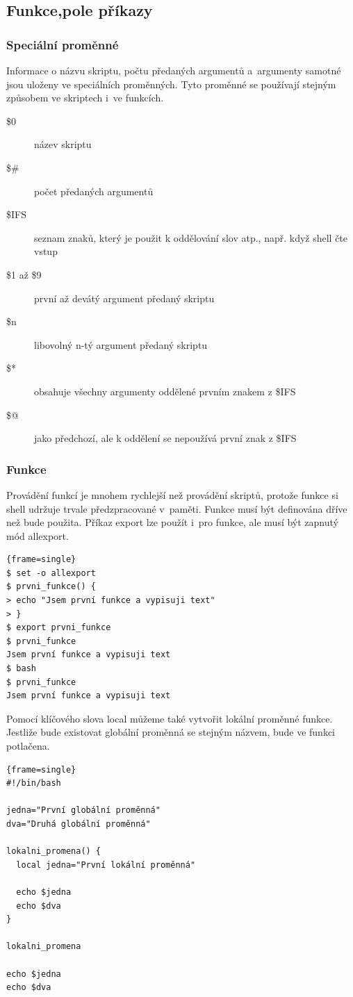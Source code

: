 \documentclass[a4paper,12pt]{article}
\newenvironment{codeframe}{%
  \begin{Sbox} 
    \begin{minipage} 
      {\columnwidth-\leftmargin-\rightmargin-2\fboxsep-2\fboxrule-4pt} 
}{%

  \end{minipage} 
  \end{Sbox} 
  \begin{center} 
    \fcolorbox{black}{codeback}{\TheSbox} 
  \end{center} 
}
\begin{document}
\subsection{Funkce,pole příkazy}
\subsubsection{Speciální proměnné}
Informace o názvu skriptu, počtu předaných argumentů a~argumenty samotné jsou uloženy ve speciálních proměnných. Tyto proměnné se používají stejným způsobem ve skriptech i~ve funkcích\cite{ABC_SBASH}.
\begin{description}
 \item[\$0] název skriptu
 \item[\$\#] počet předaných argumentů
 \item[\$IFS] seznam znaků, který je použit k oddělování slov atp., např. když shell čte vstup
 \item[\$1 až \$9] první až devátý argument předaný skriptu
 \item[\${n}] libovolný n-tý argument předaný skriptu
 \item[\$*] obsahuje všechny argumenty oddělené prvním znakem z \$IFS
 \item[\$@] jako předchozí, ale k oddělení se nepoužívá první znak z \$IFS
 \end{description}
\subsubsection{Funkce}
Provádění funkcí je mnohem rychlejší než provádění skriptů, protože funkce si shell udržuje trvale předzpracované v~paměti. Funkce musí být 
definována dříve než bude použita. Příkaz export lze použít i~pro funkce, ale musí být zapnutý mód allexport\cite{ABC_SBASH}.
    \begin{codeframe}
      \begin{Verbatim}{frame=single}
$ set -o allexport
$ prvni_funkce() {
> echo "Jsem první funkce a vypisuji text"
> }
$ export prvni_funkce
$ prvni_funkce
Jsem první funkce a vypisuji text
$ bash
$ prvni_funkce
Jsem první funkce a vypisuji text
\end{Verbatim} 
    \end{codeframe}
Pomocí klíčového slova local můžeme také vytvořit lokální proměnné funkce. Jestliže bude existovat globální proměnná se stejným názvem, bude ve funkci potlačena\cite{ABC_SBASH}.
    \begin{codeframe}
      \begin{Verbatim}{frame=single}
#!/bin/bash

jedna="První globální proměnná"
dva="Druhá globální proměnná"

lokalni_promena() {
  local jedna="První lokální proměnná"

  echo $jedna
  echo $dva
}

lokalni_promena

echo $jedna
echo $dva
\end{Verbatim} 
    \end{codeframe}
\end{document}
